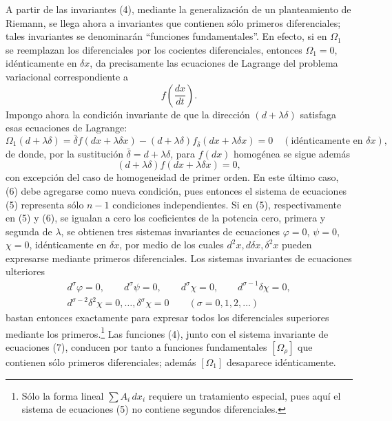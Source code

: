 \documentclass[11pt]{article}
\newcommand{\bdelta}{\bar{\delta}}
\begin{document}
A partir de las invariantes (4), mediante la generalización de un planteamiento
de Riemann, se llega ahora a invariantes que contienen sólo primeros
diferenciales; tales invariantes se denominarán ``funciones fundamentales''. En
efecto, si en \(\Omega_1\) se reemplazan los diferenciales por los cocientes
diferenciales, entonces \(\Omega_1=0\), idénticamente en \(\delta x\), da
precisamente las ecuaciones de Lagrange del problema variacional correspondiente
a
\[
f\!\left(\frac{dx}{dt}\right).
\]
Impongo ahora la condición invariante de que la dirección \((d+\lambda\delta)\)
satisfaga esas ecuaciones de Lagrange:
\begin{equation}
\Omega_1(d+\lambda\delta)=
\bdelta f(dx+\lambda\delta x)
-(d+\lambda\delta)f_{\bdelta}(dx+\lambda\delta x)=0
\quad(\text{idénticamente en }\delta x),
\tag{5}
\end{equation}
de donde, por la sustitución \(\bdelta=d+\lambda\delta\), para \(f(dx)\)
homogénea se sigue además
\begin{equation}
(d+\lambda\delta)f(dx+\lambda\delta x)=0,
\tag{6}
\end{equation}
con excepción del caso de homogeneidad de primer orden. En este último caso,
(6) debe agregarse como nueva condición, pues entonces el sistema de ecuaciones
(5) representa sólo \(n-1\) condiciones independientes. Si en (5),
respectivamente en (5) y (6), se igualan a cero los coeficientes de la potencia
cero, primera y segunda de \(\lambda\), se obtienen tres sistemas invariantes de
ecuaciones \(\varphi=0\), \(\psi=0\), \(\chi=0\), idénticamente en \(\delta x\),
por medio de los cuales \(d^2x,d\delta x,\delta^2x\) pueden expresarse mediante
primeros diferenciales. Los sistemas invariantes de ecuaciones ulteriores
\begin{equation}
\begin{gathered}
d^\sigma\varphi=0,\qquad d^\sigma\psi=0,\qquad
d^\sigma\chi=0,\qquad d^{\sigma-1}\delta\chi=0,\\
d^{\sigma-2}\delta^2\chi=0,\ldots,\delta^\sigma\chi=0
\qquad(\sigma=0,1,2,\ldots)
\end{gathered}
\tag{7}
\end{equation}
bastan entonces exactamente para expresar todos los diferenciales superiores
mediante los primeros.\footnote{Sólo la forma lineal \(\sum A_i\,dx_i\) requiere
un tratamiento especial, pues aquí el sistema de ecuaciones (5) no contiene
segundos diferenciales.} Las funciones (4), junto con el sistema invariante de
ecuaciones (7), conducen por tanto a funciones fundamentales \([\Omega_\rho]\)
que contienen sólo primeros diferenciales; además \([\Omega_1]\) desaparece
idénticamente.
\end{document}
